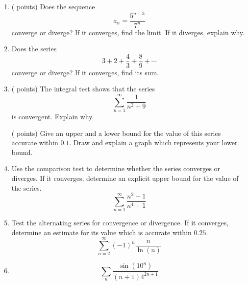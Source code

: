 \documentclass[12pt]{article}
\begin{document}
\begin{enumerate}[(1)]
( points) Does the sequence
\[
a_n = \arctan(2n)
\]
converge or diverge? If it converges, find the limit. If it diverges, explain why.
\item
( points) Does the sequence
\[
a_n = \frac{5^{n + 3}}{7^n}
\]
converge or diverge? If it converges, find the limit. If it diverges, explain why.
\item
Does the series
\[
3 + 2 + \frac{4}{3} + \frac{8}{9} + \cdots
\]
converge or diverge? If it converges, find its sum.

\item
( points) 
The integral test shows that the series
\[
\sum_{n = 1}^{\infty} \frac{1}{n^2 + 9}
\]
is convergent. Explain why.

( points)
Give an upper and a lower bound for the value of this series accurate within $0.1$.
Draw and explain a graph which represents your lower bound.

\item
Use the comparison test to 
determine whether the series converges or diverges. 
If it converges, determine an explicit upper bound for the value of the series.
\[
\sum_{n = 1}^{\infty} \frac{n^2 - 1}{n^4 + 1}
\]

\item
Test the alternating series for convergence or divergence. If it converges, determine
an estimate for its value which is accurate within $0.25$.
\[
\sum_{n = 2}^{\infty} (-1)^n \frac{n}{\ln(n)}
\]

\item
\[
\sum_n \frac{ \sin(10^n) }{(n + 1) 4^{2n + 1}}
\]

\end{enumerate}
\end{document}
